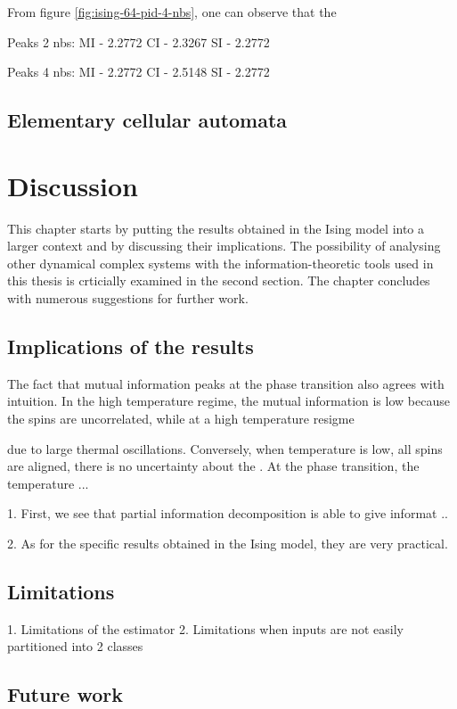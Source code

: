 \documentclass[12pt]{article}
\begin{document}
From figure \ref{fig:ising-64-pid-4-nbs}, one can observe that the 

Peaks 2 nbs:
MI - 2.2772
CI - 2.3267
SI - 2.2772

Peaks 4 nbs:
MI - 2.2772
CI - 2.5148
SI - 2.2772

\subsection{Elementary cellular automata}

\newpage
\section{Discussion}

This chapter starts by putting the results obtained in the Ising model into a larger context and by discussing their implications.  The possibility of analysing other dynamical complex systems with the information-theoretic tools used in this thesis is crticially examined in the second section. The chapter concludes with numerous suggestions for further work. 

\subsection{Implications of the results}


The fact that mutual information peaks at the phase transition also agrees with intuition. In the high temperature regime, the mutual information is low because the spins are uncorrelated, while at a high temperature resigme 

 due to large thermal oscillations. Conversely, when temperature is low, all spins are aligned, there is no uncertainty about the . At the phase transition, the temperature   ...

1. First, we see that partial information decomposition is able to give informat ..

2. As for the specific results obtained in the Ising model, they are very practical.

\subsection{Limitations}

1. Limitations of the estimator
2. Limitations when inputs are not easily partitioned into 2 classes

\subsection{Future work}
\end{document}
